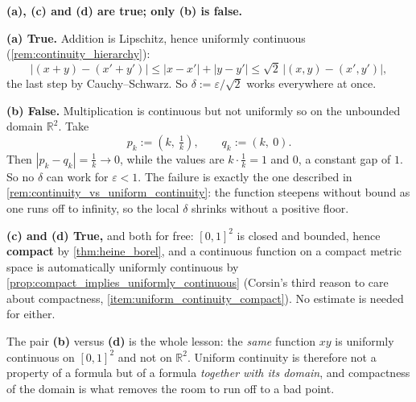 \begin{exercisesolution}
\label{sol:uniform_continuity_multiple_choice}
\textbf{(a), (c) and (d) are true; only (b) is false.}

\textbf{(a) True.} Addition is Lipschitz, hence uniformly continuous
(\cref{rem:continuity_hierarchy}):
\[\big|(x+y)-(x'+y')\big| \leq |x-x'| + |y-y'| \leq \sqrt2\,\big|(x,y)-(x',y')\big|,\]
the last step by Cauchy--Schwarz. So $\delta := \varepsilon/\sqrt2$ works everywhere at once.

\textbf{(b) False.} Multiplication is continuous but not uniformly so on the unbounded domain
$\mathbb{R}^2$. Take
\[p_k := \left(k,\ \tfrac1k\right), \qquad q_k := \left(k,\ 0\right).\]
Then $|p_k - q_k| = \tfrac1k \to 0$, while the values are $k \cdot \tfrac1k = 1$ and
$0$, a constant gap of $1$. So no $\delta$ can work for $\varepsilon < 1$. The failure is exactly
the one described in \cref{rem:continuity_vs_uniform_continuity}: the function steepens without
bound as one runs off to infinity, so the local $\delta$ shrinks without a positive floor.

\textbf{(c) and (d) True,} and both for free: $[0,1]^2$ is closed and bounded, hence
\textbf{compact} by \cref{thm:heine_borel}, and a continuous function on a compact metric space
is automatically uniformly continuous by
\cref{prop:compact_implies_uniformly_continuous} (Corsin's third reason to care about
compactness, \cref{item:uniform_continuity_compact}). No estimate is needed for either.

\begin{remark}
The pair \textbf{(b)} versus \textbf{(d)} is the whole lesson: the \emph{same} function $xy$ is
uniformly continuous on $[0,1]^2$ and not on $\mathbb{R}^2$. Uniform continuity is therefore not
a property of a formula but of a formula \emph{together with its domain}, and compactness of the
domain is what removes the room to run off to a bad point.
\end{remark}
\end{exercisesolution}

